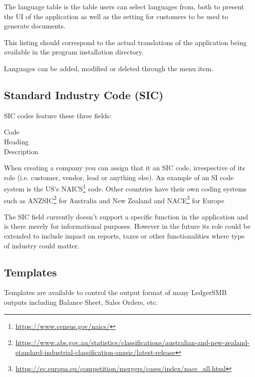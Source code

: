 The language table is the table users can select languages from, both to present
the UI of the application as well as the setting for customers to be used to generate
documents.

This listing should correspond to the actual translations of the application being
available in the program installation directory.

Languages can be added, modified or deleted through the  menu item.

\subsection{Standard Industry Code (SIC)}
\label{subsec-company-config-sic}

SIC codes feature these three fields:

\begin{description}
\item [Code]
\item [Heading]
\item [Description]
\end{description}

When creating a company you can assign that it an \gls{SIC} code, irrespective of its role (i.e. customer,
vendor, lead or anything else). An example of an SI code system is the
US's NAICS\footnote{\url{https://www.census.gov/naics/}} code.
Other countries have their own coding systems such
as ANZSIC\footnote{\url{https://www.abs.gov.au/statistics/classifications/australian-and-new-zealand-standard-industrial-classification-anzsic/latest-release}} for Australia and New Zealand
and NACE\footnote{\url{https://ec.europa.eu/competition/mergers/cases/index/nace\_all.html}} for Europe

The SIC field currently doesn't support a specific function in the application and is there
merely for informational purposes. However in the future its role could be extended to include
impact on reports, taxes or other functionalities where type of industry could matter.

\subsection {Templates}
\label{subsec-company-config-templates}

Templates are available to control the output format of many LedgerSMB outputs including Balance Sheet, Sales Orders, etc.

